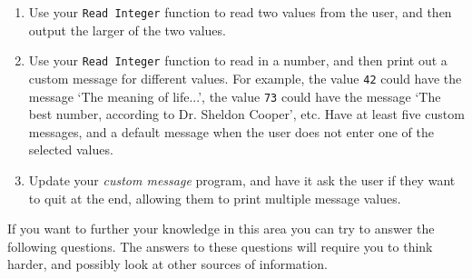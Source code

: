 \begin{enumerate}
  \item Use your \texttt{Read Integer} function to read two values from the user, and then output the larger of the two values.
  
  \item Use your \texttt{Read Integer} function to read in a number, and then print out a custom message for different values. For example, the value \texttt{42} could have the message `The meaning of life...', the value \texttt{73} could have the message `The best number, according to Dr. Sheldon Cooper', etc. Have at least five custom messages, and a default message when the user does not enter one of the selected values.
  
  \item Update your \emph{custom message} program, and have it ask the user if they want to quit at the end, allowing them to print multiple message values.
\end{enumerate}
  
\clearpage

If you want to further your knowledge in this area you can try to answer the following questions. The answers to these questions will require you to think harder, and possibly look at other sources of information.

